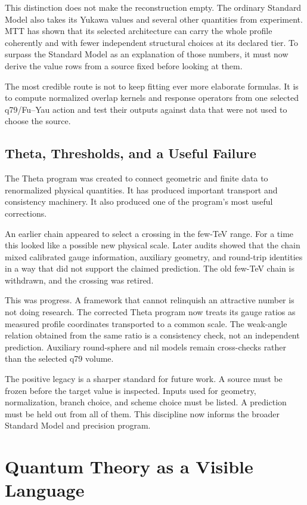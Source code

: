 \documentclass[11pt,openany]{book}
\begin{document}
This distinction does not make the reconstruction empty. The ordinary
Standard Model also takes its Yukawa values and several other quantities from
experiment. MTT has shown that its selected architecture can carry the whole
profile coherently and with fewer independent structural choices at its
declared tier. To surpass the Standard Model as an explanation of those
numbers, it must now derive the value rows from a source fixed before looking
at them.

The most credible route is not to keep fitting ever more elaborate formulas.
It is to compute normalized overlap kernels and response operators from one
selected q79/Fu--Yau action and test their outputs against data that were not
used to choose the source.

\chapter{Theta, Thresholds, and a Useful Failure}

The Theta program was created to connect geometric and finite data to
renormalized physical quantities. It has produced important transport and
consistency machinery. It also produced one of the program's most useful
corrections.

An earlier chain appeared to select a crossing in the few-TeV range. For a
time this looked like a possible new physical scale. Later audits showed that
the chain mixed calibrated gauge information, auxiliary geometry, and
round-trip identities in a way that did not support the claimed prediction.
The old few-TeV chain is withdrawn, and the crossing was retired.

This was progress. A framework that cannot relinquish an attractive number is
not doing research. The corrected Theta program now treats its gauge ratios
as measured profile coordinates transported to a common scale. The weak-angle
relation obtained from the same ratio is a consistency check, not an
independent prediction. Auxiliary round-sphere and nil models remain
cross-checks rather than the selected q79 volume.

The positive legacy is a sharper standard for future work. A source must be
frozen before the target value is inspected. Inputs used for geometry,
normalization, branch choice, and scheme choice must be listed. A prediction
must be held out from all of them. This discipline now informs the broader
Standard Model and precision program.

\part{Quantum Theory as a Visible Language}
\end{document}
